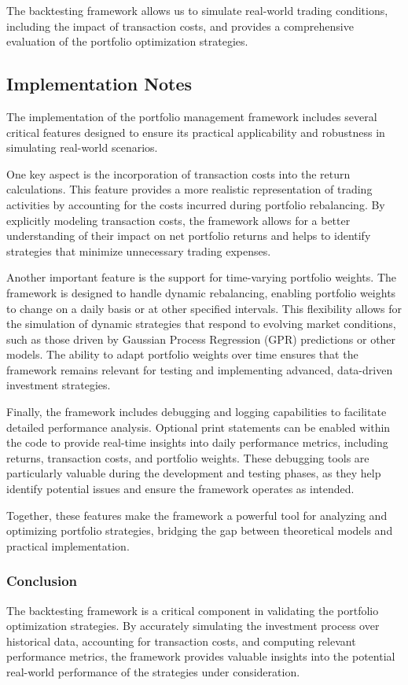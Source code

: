 The backtesting framework allows us to simulate real-world trading conditions, including the impact of transaction costs, and provides a comprehensive evaluation of the portfolio optimization strategies.

\subsection{Implementation Notes}

The implementation of the portfolio management framework includes several critical features designed to ensure its practical applicability and robustness in simulating real-world scenarios.

One key aspect is the incorporation of transaction costs into the return calculations. This feature provides a more realistic representation of trading activities by accounting for the costs incurred during portfolio rebalancing. By explicitly modeling transaction costs, the framework allows for a better understanding of their impact on net portfolio returns and helps to identify strategies that minimize unnecessary trading expenses.

Another important feature is the support for time-varying portfolio weights. The framework is designed to handle dynamic rebalancing, enabling portfolio weights to change on a daily basis or at other specified intervals. This flexibility allows for the simulation of dynamic strategies that respond to evolving market conditions, such as those driven by Gaussian Process Regression (GPR) predictions or other models. The ability to adapt portfolio weights over time ensures that the framework remains relevant for testing and implementing advanced, data-driven investment strategies.

Finally, the framework includes debugging and logging capabilities to facilitate detailed performance analysis. Optional print statements can be enabled within the code to provide real-time insights into daily performance metrics, including returns, transaction costs, and portfolio weights. These debugging tools are particularly valuable during the development and testing phases, as they help identify potential issues and ensure the framework operates as intended.

Together, these features make the framework a powerful tool for analyzing and optimizing portfolio strategies, bridging the gap between theoretical models and practical implementation.
\subsubsection{Conclusion}

The backtesting framework is a critical component in validating the portfolio optimization strategies. By accurately simulating the investment process over historical data, accounting for transaction costs, and computing relevant performance metrics, the framework provides valuable insights into the potential real-world performance of the strategies under consideration.


